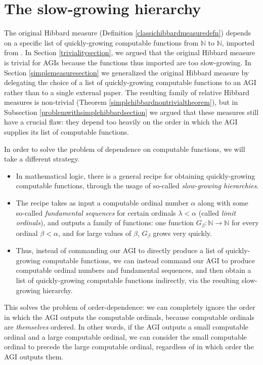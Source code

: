 \documentclass{article}
\begin{document}
\section{The slow-growing hierarchy}
\label{slowgrowinghierarchysection}

The original Hibbard measure
(Definition \ref{classichibbardmeasuredefn}) depends on a specific list of
quickly-growing computable functions from $\mathbb N$ to $\mathbb N$, imported from
\cite{liu1960enumeration}. In Section \ref{trivialitysection}, we argued
that the original Hibbard measure is trivial for AGIs because the functions thus imported
are too slow-growing.
In Section \ref{simplemeasuresection} we generalized
the original Hibbard measure
by delegating the choice of a list of quickly-growing computable functions to an AGI rather
than to a single external paper. The resulting family of relative Hibbard measures is
non-trivial (Theorem \ref{simplehibbardnontrivialtheorem}), but in
Subsection \ref{problemwithsimplehibbardsection} we argued that these
measures still have a crucial flaw: they depend too heavily on the order in which
the AGI supplies its list of computable functions.

In order to solve the problem of dependence on computable functions, we will take
a different strategy.
\begin{itemize}
    \item
    In mathematical logic, there is a general recipe for obtaining
    quickly-growing computable
    functions, through the usage of so-called \emph{slow-growing hierarchies}.
    \item
    The recipe takes as input a computable
    ordinal number $\alpha$ along with some so-called \emph{fundamental
    sequences} for certain ordinals $\lambda<\alpha$ (called \emph{limit ordinals}),
    and outputs a family of functions: one function $G_{\beta}:\mathbb N\to\mathbb N$
    for every ordinal
    $\beta<\alpha$, and for large values of $\beta$, $G_{\beta}$ grows very quickly.
    \item
    Thus, instead of
    commanding our AGI to directly produce a list of quickly-growing computable functions,
    we can instead command our AGI to produce computable ordinal numbers and
    fundamental sequences, and then obtain a list of quickly-growing
    computable functions indirectly, via the resulting slow-growing hierarchy.
\end{itemize}
This solves the problem of order-dependence: we can completely ignore the order
in which the AGI outputs the computable ordinals, because computable ordinals are
\emph{themselves} ordered. In other words, if the AGI outputs a small computable ordinal
and a large computable ordinal, we can consider the small computable ordinal to precede
the large computable ordinal, regardless of in which order the AGI outputs them.
\end{document}
